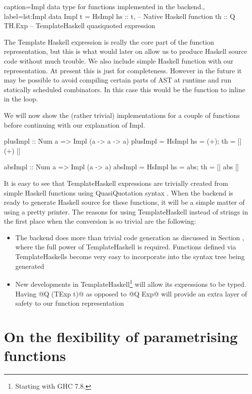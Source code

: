 \documentclass[preamble.tex]{subfiles}
\begin{document}
\begin{hscode2}{%
    caption={Impl data type for functions implemented in the backend.},%
    label=lst:Impl}
data Impl t = HsImpl {
                hs :: t,        -- Native Haskell function
                th :: Q TH.Exp  -- TemplateHaskell quasiquoted expression
              } 
\end{hscode2}


The Template Haskell expression is really the core part of the function representation, but this is what would later on allow us to produce Haskell source code without much trouble. We also include simple Haskell function with our representation. At present this is just for completeness. However in the future it may be possible to avoid compiling certain parts of AST at runtime and run statically scheduled combinators. In this case this would be the function to inline in the loop.

We will now show the (rather trivial) implementations for a couple of functions before continuing with our explanation of Impl.

\begin{hscode}
plusImpl :: Num a => Impl (a -> a -> a)
plusImpl = HsImpl { hs = (+); th = [| (+) |] } 

absImpl :: Num a => Impl (a -> a)
absImpl = HsImpl { hs = abs; th = [| abs |] } 
\end{hscode}

It is easy to see that TemplateHaskell expressions are trivially created from simple Haskell functions using QuasiQuotation syntax . When the backend is ready to generate Haskell source for these functions, it will be a simple matter of using a pretty printer. The reasons for using TemplateHaskell instead of strings in the first place when the conversion is so trivial are the following:
\begin{itemize}
\item The backend does more than trivial code generation as discussed in Section , where the full power of TemplateHaskell is required. Functions defined via TemplateHaskells become very easy to incorporate into the syntax tree being generated
\item New developments in TemplateHaskell\footnote{Starting with GHC 7.8.} will allow its expressions to be typed. Having @Q (TExp t)@ as opposed to @Q Exp@ will provide an extra layer of safety to our function representation
\end{itemize}


\section{On the flexibility of parametrising functions}
\end{document}
